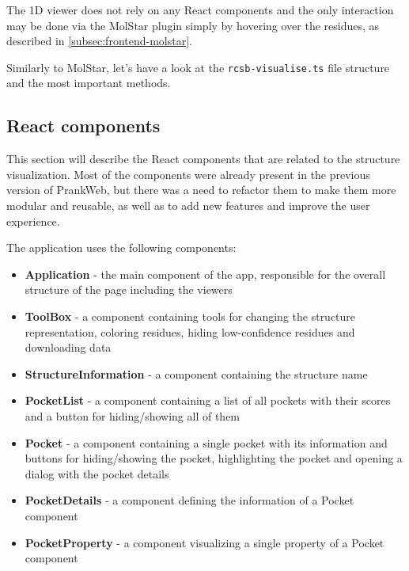 The 1D viewer does not rely on any React components and the only interaction may be done via the MolStar plugin simply by hovering over the residues, as described in \cref{subsec:frontend-molstar}.

Similarly to MolStar, let's have a look at the \texttt{rcsb-visualise.ts} file structure and the most important methods.




\subsection{React components}
\label{subsec:frontend-react}

This section will describe the React components that are related to the structure visualization. Most of the components were already present in the previous version of PrankWeb, but there was a need to refactor them to make them more modular and reusable, as well as to add new features and improve the user experience.

The application uses the following components:

\begin{itemize}
    \item \textbf{Application} - the main component of the app, responsible for the overall structure of the page including the viewers
    \item \textbf{ToolBox} - a component containing tools for changing the structure representation, coloring residues, hiding low-confidence residues and downloading data
    \item \textbf{StructureInformation} - a component containing the structure name
    \item \textbf{PocketList} - a component containing a list of all pockets with their scores and a button for hiding/showing all of them
    \item \textbf{Pocket} - a component containing a single pocket with its information and buttons for hiding/showing the pocket, highlighting the pocket and opening a dialog with the pocket details
    \item \textbf{PocketDetails} - a component defining the information of a Pocket component
    \item \textbf{PocketProperty} - a component visualizing a single property of a Pocket component
\end{itemize}


